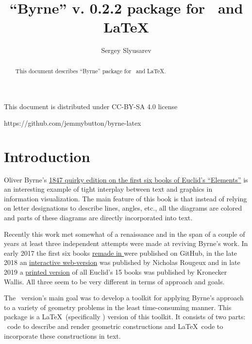 \documentclass{ltxdoc}
\author{Sergey Slyusarev}
\title{``Byrne'' v. 0.2.2 package for \METAPOST\ and \LaTeX}
\begin{document}
\maketitle

\begin{abstract}
This document describes ``Byrne'' package for \METAPOST\ and \LaTeX.
\end{abstract}

\begin{centering}

This document is distributed under CC-BY-SA 4.0 license 

\ccbysa 

https://github.com/jemmybutton/byrne-latex

\end{centering}

\section{Introduction}
Oliver Byrne's \href{https://archive.org/details/firstsixbooksofe00byrn/}{1847 quirky edition on the first six books of Euclid's ``Elements''} is an interesting example of tight interplay between text and graphics in information visualization. The main feature of this book is that instead of relying on letter designations to describe lines, angles, etc., all the diagrams are colored and parts of these diagrams are directly incorporated into text.

Recently this work met somewhat of a renaissance and in the span of a couple of years at least three independent attempts were made at reviving Byrne's work. In early 2017 the first six books \href{https://github.com/jemmybutton/byrne-euclid/}{remade in \ConTeXt} were published on GitHub, in the late 2018 an \href{https://www.c82.net/euclid/}{interactive web-version} was published by Nicholas Rougeux and in late 2019 a \href{https://www.kroneckerwallis.com/product/euclids-elements-completing-oliver-byrnes-work/}{printed version} of all Euclid's 15 books was published by Kronecker Wallis. All three seem to be very different in terms of approach and goals.

The \ConTeXt\ version's main goal was to develop a toolkit for applying Byrne's approach to a variety of geometry problems in the least time-consuming manner. This package is a \LaTeX\ (specifically \LuaLaTeX) version of this toolkit. It consists of two parts: \METAPOST\ code to describe and render geometric constructions and \LaTeX\ code to incorporate these constructions in text.
\end{document}
